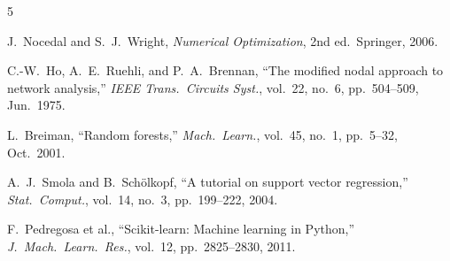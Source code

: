 \documentclass[journal,twocolumn]{IEEEtran}
\begin{document}
\begin{thebibliography}{5}

J.\ Nocedal and S.\ J.\ Wright, \textit{Numerical Optimization}, 2nd ed.\ Springer, 2006.

C.-W.\ Ho, A.\ E.\ Ruehli, and P.\ A.\ Brennan, ``The modified nodal approach to network analysis,'' \textit{IEEE Trans.\ Circuits Syst.}, vol.\ 22, no.\ 6, pp.\ 504--509, Jun.\ 1975.

L.\ Breiman, ``Random forests,'' \textit{Mach.\ Learn.}, vol.\ 45, no.\ 1, pp.\ 5--32, Oct.\ 2001.

A.\ J.\ Smola and B.\ Sch\"{o}lkopf, ``A tutorial on support vector regression,'' \textit{Stat.\ Comput.}, vol.\ 14, no.\ 3, pp.\ 199--222, 2004.

F.\ Pedregosa et al., ``Scikit-learn: Machine learning in Python,'' \textit{J.\ Mach.\ Learn.\ Res.}, vol.\ 12, pp.\ 2825--2830, 2011.

\end{thebibliography}
\end{document}
